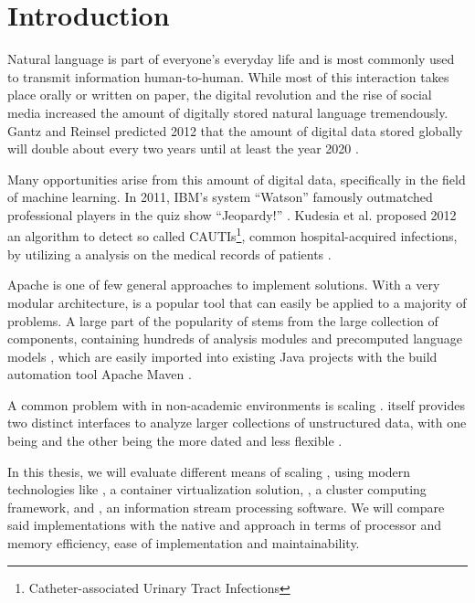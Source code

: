 \chapter{Introduction}

Natural language is part of everyone's everyday life and is most commonly used to transmit information human-to-human. While most of this interaction takes place orally or written on paper, the digital revolution and the rise of social media increased the amount of digitally stored natural language tremendously. Gantz and Reinsel predicted 2012 that the amount of digital data stored globally will double about every two years until at least the year 2020 \cite{gantz2012digital}.

Many opportunities arise from this amount of digital data, specifically in the field of machine learning. In 2011, IBM's \qa{} system ``Watson'' famously outmatched professional players in the quiz show ``Jeopardy!'' \cite{ferrucci2012introduction,epstein2012making}. Kudesia et al. proposed 2012 an algorithm to detect so called CAUTIs\footnote{Catheter-associated Urinary Tract Infections}, common hospital-acquired infections, by utilizing a \nlp{} analysis on the medical records of patients \cite{kudesia2012natural}.

Apache \uima{} is one of few general approaches to implement \nlp{} solutions. With a very modular architecture, \uima{} is a popular tool that can easily be applied to a majority of \nlp{} problems. A large part of the popularity of \uima{} stems from the large \dkpro{} collection of components, containing hundreds of analysis modules and precomputed language models \cite{eckartdecastilho-gurevych:2014:OIAF4HLT}, which are easily imported into existing Java projects with the build automation tool Apache Maven \cite{dkpro}.

A common problem with \uima{} in non-academic environments is scaling \cite{divita2015scaling,epstein2012making,ramakrishnan2010building}. \uima{} itself provides two distinct interfaces to analyze larger collections of unstructured data, with one being \uimaas{} and the other being the more dated and less flexible \cpe{} \cite{OASIS:UIMA:2009}.

In this thesis, we will evaluate different means of scaling \uima{}, using modern technologies like \docker{}, a container virtualization solution, \spark{}, a cluster computing framework, and \kafka{}, an information stream processing software. We will compare said implementations with the native \uimaas{} and \cpe{} approach in terms of processor and memory efficiency, ease of implementation and maintainability.


